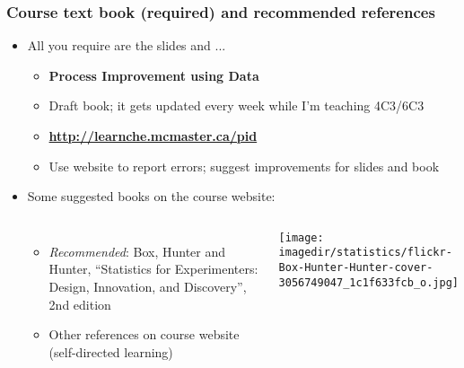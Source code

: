 \begin{frame}\frametitle{Course text book (required) and recommended references}
	\begin{itemize}
		\item	All you require are the slides and ...
		\begin{itemize}
			\item	\textbf{Process Improvement using Data}
			\item	Draft book; it gets updated every week while I'm teaching 4C3/6C3
			\item	\textbf{\href{http://learnche.mcmaster.ca/pid?source=4C3-admin-notes}{http://learnche.mcmaster.ca/pid}}
			\item	Use website to report errors; suggest improvements for slides and book
		\end{itemize}
	\end{itemize}
	\begin{itemize}
		\item	Some suggested books on the course website:
		\begin{columns}[t]
				\begin{itemize}
					\item	\emph{Recommended}: Box, Hunter and Hunter, ``Statistics for Experimenters: Design, Innovation, and Discovery'', 2nd edition
					\item	Other references on course website (self-directed learning)
				\end{itemize}
				\vspace{-1cm}
				\begin{center}
					\texttt{[image: \\imagedir/statistics/flickr-Box-Hunter-Hunter-cover-3056749047\_1c1f633fcb\_o.jpg]}
				\end{center}
		\end{columns}
	\end{itemize}
\end{frame}

